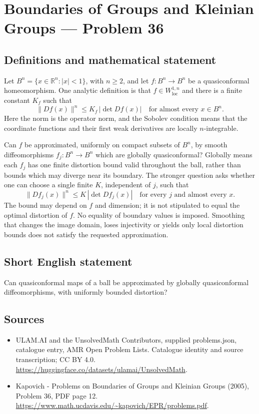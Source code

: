 \documentclass[11pt,a4paper]{article}
\begin{document}
\section*{Boundaries of Groups and Kleinian Groups — Problem 36}\label{statement}

\subsection{Definitions and mathematical statement}
Let $B^n=\{x\in\mathbb R^n:|x|<1\}$, with $n\geq2$, and let $f:B^n\to B^n$ be a quasiconformal homeomorphism. One analytic definition is that $f\in W^{1,n}_{\mathrm{loc}}$ and there is a finite constant $K_f$ such that
\[
 \lVert Df(x)\rVert^n\leq K_f\,|\det Df(x)|
 \quad\text{for almost every }x\in B^n.
\]
Here the norm is the operator norm, and the Sobolev condition means that the coordinate functions and their first weak derivatives are locally $n$-integrable.

Can $f$ be approximated, uniformly on compact subsets of $B^n$, by smooth diffeomorphisms $f_j:B^n\to B^n$ which are globally quasiconformal? Globally means each $f_j$ has one finite distortion bound valid throughout the ball, rather than bounds which may diverge near its boundary. The stronger question asks whether one can choose a single finite $K$, independent of $j$, such that
\[
 \lVert Df_j(x)\rVert^n\leq K\,|\det Df_j(x)|
 \quad\text{for every }j\text{ and almost every }x.
\]
The bound may depend on $f$ and dimension; it is not stipulated to equal the optimal distortion of $f$. No equality of boundary values is imposed. Smoothing that changes the image domain, loses injectivity or yields only local distortion bounds does not satisfy the requested approximation.
\subsection{Short English statement}
Can quasiconformal maps of a ball be approximated by globally quasiconformal diffeomorphisms, with uniformly bounded distortion?
\subsection{Sources}
\begin{itemize}
\item[S1] ULAM.AI and the UnsolvedMath Contributors, supplied problems.json, catalogue entry, AMR Open Problem Lists. Catalogue identity and source transcription; CC BY 4.0.
\url{https://huggingface.co/datasets/ulamai/UnsolvedMath}.
\item[S2] Kapovich - Problems on Boundaries of Groups and Kleinian Groups (2005), Problem 36, PDF page 12. 
\url{https://www.math.ucdavis.edu/~kapovich/EPR/problems.pdf}.
\end{itemize}
\end{document}
